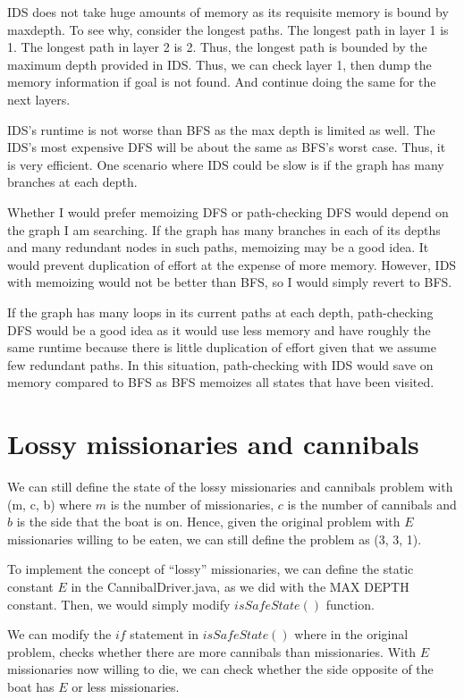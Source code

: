 \documentclass[a4paper]{report}
\begin{document}
IDS does not take huge amounts of memory as its requisite memory is bound by maxdepth. To see why, consider the longest paths. 
The longest path in layer 1 is 1. The longest path in layer 2 is 2. Thus, the longest path is bounded by the 
maximum depth provided in IDS. Thus, we can check layer 1, then dump the memory information if goal is not found.
And continue doing the same for the next layers. 

IDS's runtime is not worse than BFS as the max depth is limited as well. The IDS's most expensive DFS will be about the same
as BFS's worst case. Thus, it is very efficient. One scenario where IDS could be slow is if the graph has many branches
at each depth. 

Whether I would prefer memoizing DFS or path-checking DFS would depend on the graph I am searching. If the graph has many
branches in each of its depths and many redundant nodes in such paths, memoizing may be a good idea. It would prevent duplication
of effort at the expense of more memory. However, IDS with memoizing would not be better than BFS, so I would simply revert to 
BFS. 

If the graph has many loops in its current paths at each depth, path-checking DFS would be a good idea as it would use
less memory and have roughly the same runtime because there is little duplication of effort given that we assume
few redundant paths.  In this situation, path-checking with IDS would save on memory compared to BFS as BFS memoizes all states
that have been visited. 


\section{Lossy missionaries and cannibals}
We can still define the state of the lossy missionaries and cannibals problem with (m, c, b) where
$m$ is the number of missionaries, $c$ is the number of cannibals and $b$ is the side that the boat 
is on. Hence, given the original problem with $E$ missionaries willing to be eaten, we can still define
the problem as (3, 3, 1). 

To implement the concept of ``lossy'' missionaries, we can define the static constant $E$ in the
CannibalDriver.java, as we did with the MAX DEPTH constant. Then, we would simply modify $isSafeState()$
function. 

We can modify the $if$ statement in $isSafeState()$ where in the original problem, checks whether there are more cannibals than
missionaries. With $E$ missionaries now willing to die, we can check whether the side opposite of the boat 
has $E$ or less missionaries.
\end{document}
